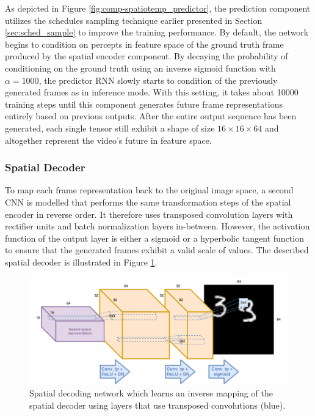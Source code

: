 As depicted in Figure \ref{fig:comp-spatiotemp_predictor}, the prediction component utilizes the schedules sampling technique earlier presented in Section \ref{sec:sched_sample} to improve the training performance. By default, the network begins to condition on percepts in feature space of the ground truth frame produced by the spatial encoder component. By decaying the probability of conditioning on the ground truth using an inverse sigmoid function with $\alpha = 1000$, the predictor RNN slowly starts to condition of the previously generated frames as in inference mode. With this setting, it takes about \num{10000} training steps until this component generates future frame representations entirely based on previous outputs. After the entire output sequence has been generated, each single tensor still exhibit a shape of size $16\times16\times64$ and altogether represent the video's future in feature space.

\subsubsection{Spatial Decoder}

To map each frame representation back to the original image space, a second CNN is modelled that performs the same transformation steps of the spatial encoder in reverse order. It therefore uses transposed convolution layers with rectifier units and batch normalization layers in-between. However, the activation function of the output layer is either a sigmoid or a hyperbolic tangent function to ensure that the generated frames exhibit a valid scale of values. The described spatial decoder is illustrated in Figure \ref{fig:comp-spatial_decoder}.

\begin{figure}[htb]
	\centering
	\includegraphics[width=0.8\linewidth]{figures/comp_spatial_decoder.pdf} 
	\caption[Spatial Decoder Component]{Spatial decoding network which learns an inverse mapping of the spatial decoder using layers that use transposed convolutions (blue).} \label{fig:comp-spatial_decoder}
\end{figure}

